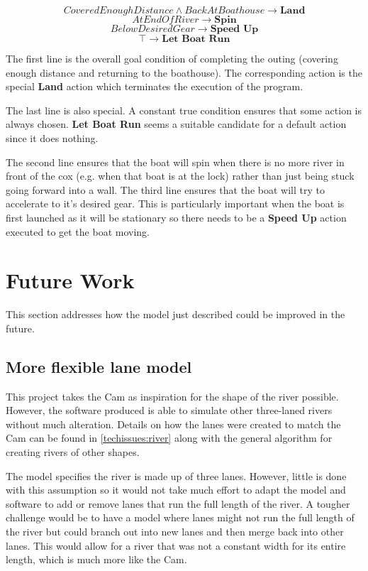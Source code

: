 \[ CoveredEnoughDistance \wedge BackAtBoathouse \to \textbf{Land} \]
\[ AtEndOfRiver \to \textbf{Spin} \]
\[ BelowDesiredGear \to \textbf{Speed Up} \]
\[ \top \to \textbf{Let Boat Run} \]

The first line is the overall goal condition of completing the outing (covering enough distance and returning to the boathouse). The corresponding action is the special \textbf{Land} action which terminates the execution of the program.

The last line is also special. A constant true condition ensures that some action is always chosen. \textbf{Let Boat Run} seems a suitable candidate for a default action since it does nothing.

The second line ensures that the boat will spin when there is no more river in front of the cox (e.g. when that boat is at the lock) rather than just being stuck going forward into a wall. The third line ensures that the boat will try to accelerate to it's desired gear. This is particularly important when the boat is first launched as it will be stationary so there needs to be a \textbf{Speed Up} action executed to get the boat moving.

\section{Future Work}
This section addresses how the model just described could be improved in the future. 

\subsection{More flexible lane model}
This project takes the Cam as inspiration for the shape of the river possible. However, the software produced is able to simulate other three-laned rivers without much alteration. Details on how the lanes were created to match the Cam can be found in \ref{techissues:river} along with the general algorithm for creating rivers of other shapes. 

The model specifies the river is made up of three lanes. However, little is done with this assumption so it would not take much effort to adapt the model and software to add or remove lanes that run the full length of the river. A tougher challenge would be to have a model where lanes might not run the full length of the river but could branch out into new lanes and then merge back into other lanes. This would allow for a river that was not a constant width for its entire length, which is much more like the Cam.

